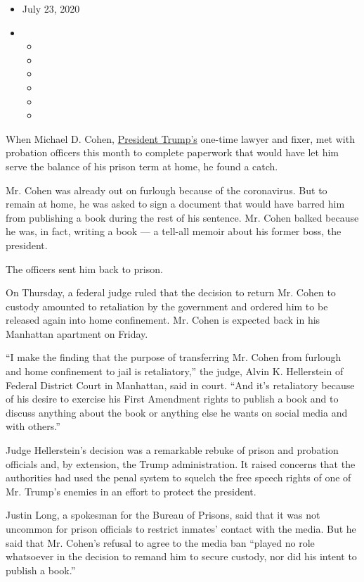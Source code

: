 \begin{itemize}
\item
  July 23, 2020
\item
  \begin{itemize}
  \item
  \item
  \item
  \item
  \item
  \item
  \end{itemize}
\end{itemize}

When Michael D. Cohen,
\href{https://www.nytimes3xbfgragh.onion/2020/07/23/us/politics/person-woman-man-camera-tv-trump.html}{President
Trump's} one-time lawyer and fixer, met with probation officers this
month to complete paperwork that would have let him serve the balance of
his prison term at home, he found a catch.

Mr. Cohen was already out on furlough because of the coronavirus. But to
remain at home, he was asked to sign a document that would have barred
him from publishing a book during the rest of his sentence. Mr. Cohen
balked because he was, in fact, writing a book --- a tell-all memoir
about his former boss, the president.

The officers sent him back to prison.

On Thursday, a federal judge ruled that the decision to return Mr. Cohen
to custody amounted to retaliation by the government and ordered him to
be released again into home confinement. Mr. Cohen is expected back in
his Manhattan apartment on Friday.

``I make the finding that the purpose of transferring Mr. Cohen from
furlough and home confinement to jail is retaliatory,'' the judge, Alvin
K. Hellerstein of Federal District Court in Manhattan, said in court.
``And it's retaliatory because of his desire to exercise his First
Amendment rights to publish a book and to discuss anything about the
book or anything else he wants on social media and with others.''

Judge Hellerstein's decision was a remarkable rebuke of prison and
probation officials and, by extension, the Trump administration. It
raised concerns that the authorities had used the penal system to
squelch the free speech rights of one of Mr. Trump's enemies in an
effort to protect the president.

Justin Long, a spokesman for the Bureau of Prisons, said that it was not
uncommon for prison officials to restrict inmates' contact with the
media. But he said that Mr. Cohen's refusal to agree to the media ban
``played no role whatsoever in the decision to remand him to secure
custody, nor did his intent to publish a book.''

